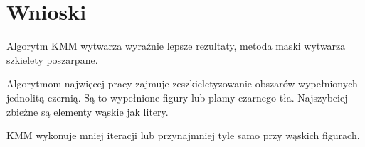 \documentclass[a4paper,12pt]{article}
\begin{document}
\newpage	
\section{Wnioski}
Algorytm KMM wytwarza wyraźnie lepsze rezultaty, metoda maski wytwarza szkielety poszarpane.

Algorytmom najwięcej pracy zajmuje zeszkieletyzowanie obszarów wypełnionych jednolitą czernią. Są to wypełnione figury lub plamy czarnego tła. Najszybciej zbieżne są elementy wąskie jak litery.

KMM wykonuje mniej iteracji lub przynajmniej tyle samo przy wąskich figurach. 
\end{document}

